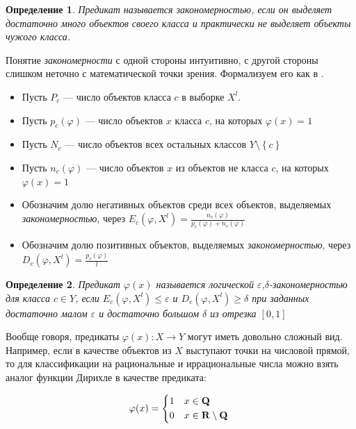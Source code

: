 \documentclass[12pt]{article}
\newtheorem{definition}{Определение}
\begin{document}
\begin{definition}
  Предикат называется \emph{закономерностью}, если он выделяет
  достаточно много объектов своего класса и практически не выделяет
  объекты чужого класса.
\end{definition}

Понятие \emph{закономерности} с одной стороны интуитивно, с другой
стороны слишком неточно с математической точки зрения. Формализуем его
как в \cite{voron10logicalgs}.

\begin{itemize}
\item Пусть \(P_c\) --- число объектов класса \(c\) в выборке \(X^l\).
\item Пусть \(p_c(\varphi)\) --- число объектов \(x\) класса \(c\), на
  которых \(\varphi(x) = 1\)
\item Пусть \(N_c\) --- число объектов всех остальных классов \(Y
  \setminus \left\{c\right\}\)
\item Пусть \(n_c(\varphi)\) --- число объектов \(x\) из объектов не
  класса \(c\), на которых \(\varphi(x) = 1\)
\item Обозначим долю негативных объектов среди всех объектов,
  выделяемых \emph{закономерностью}, через \(E_c(\varphi, X^l) =
  \frac{n_c(\varphi)}{p_c(\varphi) + n_c(\varphi)}\)
\item Обозначим долю позитивных объектов, выделяемых
  \emph{закономерностью}, через \(D_c(\varphi, X^l) =
  \frac{p_c(\varphi)}{l}\)
\end{itemize}

\begin{definition}
  Предикат \(\varphi(x)\) называется \emph{логической
    \(\varepsilon\),\(\delta\)-закономерностью} для класса \(c \in
  Y\), если \(E_c(\varphi, X^l) \leq \varepsilon \) и \(D_c(\varphi,
  X^l)\geq\delta\) при заданных достаточно малом \(\varepsilon\) и
  достаточно большом \(\delta\) из отрезка \([0, 1]\)
\end{definition}

Вообще говоря, предикаты \(\varphi(x)\colon X \rightarrow Y\) могут
иметь довольно сложный вид. Например, если в качестве объектов из
\(X\) выступают точки на числовой прямой, то для классификации на
рациональные и иррациональные числа можно взять аналог функции Дирихле
в качестве предиката:

\[
\varphi(x) =
\begin{dcases*}
1 & \(x \in \mathbf{Q}\) \\
0 & \(x \in \mathbf{R} \setminus \mathbf{Q}\)
\end{dcases*}
\]
\end{document}
